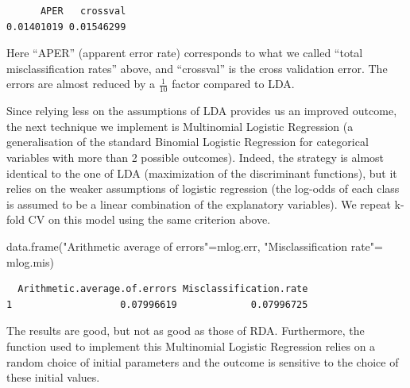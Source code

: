 \documentclass[
  letterpaper,
  DIV=11,
  numbers=noendperiod]{scrartcl}
\newenvironment{Shaded}{\begin{snugshade}}{\end{snugshade}}
\newcommand{\AttributeTok}[1]{\textcolor[rgb]{0.40,0.45,0.13}{#1}}
\newcommand{\ConstantTok}[1]{\textcolor[rgb]{0.56,0.35,0.01}{#1}}
\newcommand{\DecValTok}[1]{\textcolor[rgb]{0.68,0.00,0.00}{#1}}
\newcommand{\FunctionTok}[1]{\textcolor[rgb]{0.28,0.35,0.67}{#1}}
\newcommand{\NormalTok}[1]{\textcolor[rgb]{0.00,0.23,0.31}{#1}}
\newcommand{\OtherTok}[1]{\textcolor[rgb]{0.00,0.23,0.31}{#1}}
\newcommand{\SpecialCharTok}[1]{\textcolor[rgb]{0.37,0.37,0.37}{#1}}
\newcommand{\StringTok}[1]{\textcolor[rgb]{0.13,0.47,0.30}{#1}}
\begin{document}
\begin{Shaded}
\end{Shaded}

\begin{verbatim}
      APER   crossval 
0.01401019 0.01546299 
\end{verbatim}

Here ``APER'' (apparent error rate) corresponds to what we called
``total misclassification rates'' above, and ``crossval'' is the cross
validation error. The errors are almost reduced by a \(\frac{1}{10}\)
factor compared to LDA.

Since relying less on the assumptions of LDA provides us an improved
outcome, the next technique we implement is Multinomial Logistic
Regression (a generalisation of the standard Binomial Logistic
Regression for categorical variables with more than 2 possible
outcomes). Indeed, the strategy is almost identical to the one of LDA
(maximization of the discriminant functions), but it relies on the
weaker assumptions of logistic regression (the log-odds of each class is
assumed to be a linear combination of the explanatory variables). We
repeat k-fold CV on this model using the same criterion above.

\begin{Shaded}
\begin{Highlighting}[]
\FunctionTok{data.frame}\NormalTok{(}\StringTok{"Arithmetic average of errors"}\OtherTok{=}\NormalTok{mlog.err, }
           \StringTok{"Misclassification rate"}\OtherTok{=}\NormalTok{ mlog.mis)}
\end{Highlighting}
\end{Shaded}

\begin{verbatim}
  Arithmetic.average.of.errors Misclassification.rate
1                   0.07996619             0.07996725
\end{verbatim}

The results are good, but not as good as those of RDA. Furthermore, the
function used to implement this Multinomial Logistic Regression relies
on a random choice of initial parameters and the outcome is sensitive to
the choice of these initial values.
\end{document}

